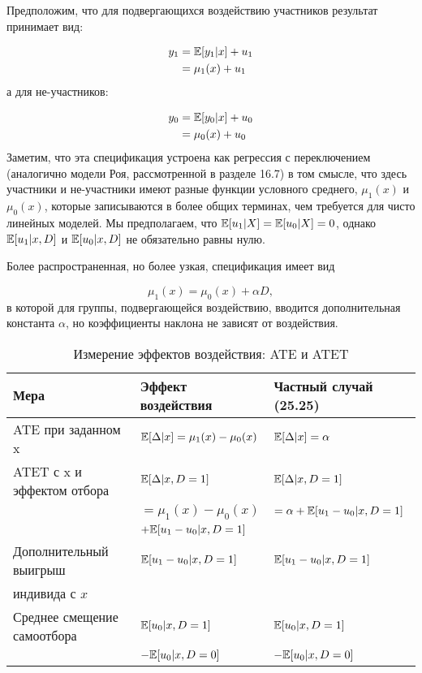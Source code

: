 Предположим, что для подвергающихся воздействию участников результат принимает вид:

\begin{align}
\label{eq25.22}
y_1 & =  \mathbb{E}[ y_1 | x]  + u_1  \\
& =  \mu_1(x) + u_1
\end{align}
а для не-участников:

\begin{align}
\label{eq25.24}
y_0 & =  \mathbb{E}[ y_0 | x]  + u_0  \\
& =  \mu_0(x) + u_0
\end{align}
Заметим, что эта спецификация устроена как регрессия с переключением (аналогично модели Роя, рассмотренной в разделе 16.7) в том смысле, что здесь участники и не-участники имеют разные функции условного среднего, $\mu_1(x)$ и $\mu_0(x)$, которые записываются в более общих терминах, чем требуется для чисто линейных моделей. Мы предполагаем, что $\mathbb{E} [u_1 | X] = \mathbb{E}[u_0 | X] = 0$, однако $\mathbb{E} [u_1 | x, D]$ и $\mathbb{E} [u_0 | x, D]$ не обязательно равны нулю. 

Более распространенная, но более узкая, спецификация имеет вид

\begin{equation}
\label{eq25.25}
\mu_1 (x) = \mu_0 (x) + \alpha D, 
\end{equation}
в которой для группы, подвергающейся воздействию, вводится дополнительная константа $\alpha$, но коэффициенты наклона не зависят от воздействия. 

\begin{table}[!h]
\caption{\label{tab:ateatet} Измерение эффектов воздействия: ATE и ATET}
\begin{center}
\begin{tabular}{lll}
\hline
\hline
Мера & Эффект воздействия & Частный случай (25.25) \\
\hline
ATE при заданном x & $\mathbb{E} [\Delta | x] = \mu_1(x) - \mu_0(x) $ & $\mathbb{E}[\Delta | x] = \alpha$ \\
ATET с x и эффектом отбора & $\mathbb{E} [\Delta | x, D = 1] $ & $\mathbb{E}[\Delta | x, D = 1]$ \\
& $ = \mu_1(x) - \mu_0(x)$ & $ = \alpha + \mathbb{E} [u_1 - u_0 | x, D = 1]$ \\
& $ + \mathbb{E}[u_1 - u_0 | x, D = 1]$ & \\

Дополнительный выигрыш & $\mathbb{E} [u_1 - u_0 | x, D = 1] $ & $\mathbb{E} [u_1 - u_0 | x, D = 1]$ \\
индивида с $x$ & & \\
Среднее смещение самоотбора & $\mathbb{E} [u_0 | x, D = 1]$ & $\mathbb{E} [u_0 | x, D = 1]$ \\
&  $ - \mathbb{E} [u_0 | x, D = 0]$ & $ - \mathbb{E} [u_0 | x, D = 0]$ \\
\hline
\hline
\end{tabular}
\end{center}
\end{table}


